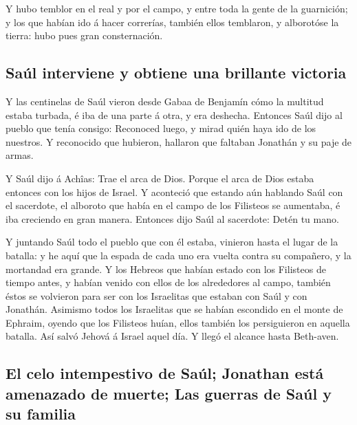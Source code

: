  Y hubo temblor en el real y por el campo, y entre toda la
gente de la guarnición; y los que habían ido á hacer correrías, también
ellos temblaron, y alborotóse la tierra: hubo pues gran consternación.

\hypertarget{sauxfal-interviene-y-obtiene-una-brillante-victoria}{%
\subsection{Saúl interviene y obtiene una brillante
victoria}\label{sauxfal-interviene-y-obtiene-una-brillante-victoria}}

 Y las centinelas de Saúl vieron desde Gabaa de Benjamín
cómo la multitud estaba turbada, é iba de una parte á otra, y era
deshecha.  Entonces Saúl dijo al pueblo que tenía consigo:
Reconoced luego, y mirad quién haya ido de los nuestros. Y reconocido
que hubieron, hallaron que faltaban Jonathán y su paje de armas.

 Y Saúl dijo á Achîas: Trae el arca de Dios. Porque el arca
de Dios estaba entonces con los hijos de Israel.  Y
aconteció que estando aún hablando Saúl con el sacerdote, el alboroto
que había en el campo de los Filisteos se aumentaba, é iba creciendo en
gran manera. Entonces dijo Saúl al sacerdote: Detén tu mano.

 Y juntando Saúl todo el pueblo que con él estaba, vinieron
hasta el lugar de la batalla: y he aquí que la espada de cada uno era
vuelta contra su compañero, y la mortandad era grande.  Y
los Hebreos que habían estado con los Filisteos de tiempo antes, y
habían venido con ellos de los alrededores al campo, también éstos se
volvieron para ser con los Israelitas que estaban con Saúl y con
Jonathán.  Asimismo todos los Israelitas que se habían
escondido en el monte de Ephraim, oyendo que los Filisteos huían, ellos
también los persiguieron en aquella batalla.  Así salvó
Jehová á Israel aquel día. Y llegó el alcance hasta Beth-aven.

\hypertarget{el-celo-intempestivo-de-sauxfal-jonathan-estuxe1-amenazado-de-muerte-las-guerras-de-sauxfal-y-su-familia}{%
\subsection{El celo intempestivo de Saúl; Jonathan está amenazado de
muerte; Las guerras de Saúl y su
familia}\label{el-celo-intempestivo-de-sauxfal-jonathan-estuxe1-amenazado-de-muerte-las-guerras-de-sauxfal-y-su-familia}}

